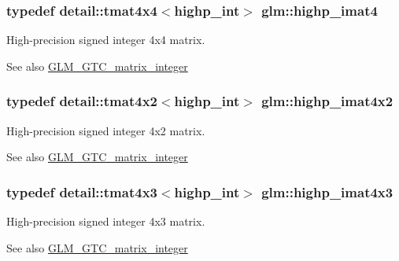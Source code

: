 \subsubsection[{highp\+\_\+imat4}]{\setlength{\rightskip}{0pt plus 5cm}typedef detail\+::tmat4x4$<$highp\+\_\+int$>$ {\bf glm\+::highp\+\_\+imat4}}\label{group__gtc__matrix__integer_ga59980867b7f2a7ec595fbb283a555d4c}
High-\/precision signed integer 4x4 matrix. \begin{DoxySeeAlso}{See also}
\hyperlink{group__gtc__matrix__integer}{G\+L\+M\+\_\+\+G\+T\+C\+\_\+matrix\+\_\+integer} 
\end{DoxySeeAlso}
\hypertarget{group__gtc__matrix__integer_gaf7ffcc749993239f1871f1acd8b06cca}{}
\subsubsection[{highp\+\_\+imat4x2}]{\setlength{\rightskip}{0pt plus 5cm}typedef detail\+::tmat4x2$<$highp\+\_\+int$>$ {\bf glm\+::highp\+\_\+imat4x2}}\label{group__gtc__matrix__integer_gaf7ffcc749993239f1871f1acd8b06cca}
High-\/precision signed integer 4x2 matrix. \begin{DoxySeeAlso}{See also}
\hyperlink{group__gtc__matrix__integer}{G\+L\+M\+\_\+\+G\+T\+C\+\_\+matrix\+\_\+integer} 
\end{DoxySeeAlso}
\hypertarget{group__gtc__matrix__integer_gaf644a447ba64f23d2245f0a3cac9cc74}{}
\subsubsection[{highp\+\_\+imat4x3}]{\setlength{\rightskip}{0pt plus 5cm}typedef detail\+::tmat4x3$<$highp\+\_\+int$>$ {\bf glm\+::highp\+\_\+imat4x3}}\label{group__gtc__matrix__integer_gaf644a447ba64f23d2245f0a3cac9cc74}
High-\/precision signed integer 4x3 matrix. \begin{DoxySeeAlso}{See also}
\hyperlink{group__gtc__matrix__integer}{G\+L\+M\+\_\+\+G\+T\+C\+\_\+matrix\+\_\+integer} 
\end{DoxySeeAlso}
\hypertarget{group__gtc__matrix__integer_gaff23c95b5feea2b2352b377810783823}{}
